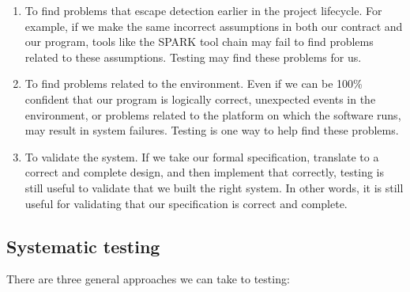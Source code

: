 \begin{enumerate}

 \item To find problems that escape detection earlier in the project lifecycle. For example, if we make the same incorrect assumptions in both our contract and our program, tools like the SPARK tool chain may fail to find problems related to these assumptions. Testing may find these problems for us.

 \item To find problems related to the environment. Even if we can be 100\% confident that our program is logically correct, unexpected events in the environment, or problems related to the platform on which the software runs, may result in system failures. Testing is one way to help find these problems.

 \item To validate the system. If we take our formal specification, translate to a correct and complete design, and then implement that correctly, testing is still useful to validate that we built the right system. In other words, it is still useful for validating that our specification is correct and complete.

\end{enumerate}

\subsection{Systematic testing}

There are three general approaches we can take to testing:

